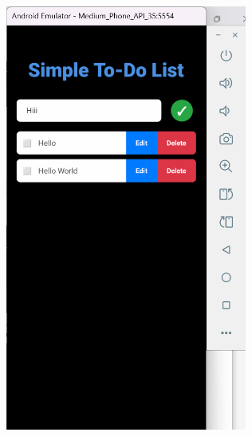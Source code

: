 \documentclass{article}
\begin{document}
\includegraphics[width=3.14063in,height=5.53233in]{media/image40.png}
    
\end{document}
